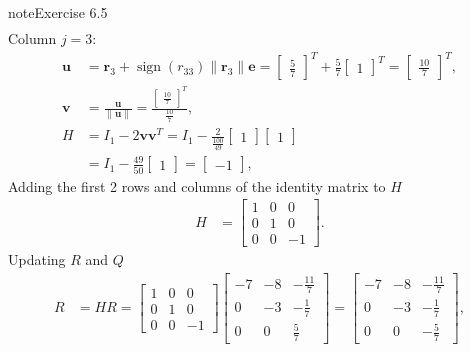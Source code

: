 \documentclass[letterpaper,10pt,english]{jupyterBook}
\begin{document}
\begin{sphinxadmonition}{note}{Exercise 6.5}
\begin{align*}
\end{align*}
\sphinxAtStartPar
Column \(j = 3\):
\begin{align*}
    \mathbf{u} &= \mathbf{r}_{3} + \operatorname{sign}(r_{33}) \| \mathbf{r}_{3} \| \mathbf{e} = \left[\begin{matrix}\frac{5}{7}\end{matrix}\right]^T + \frac{5}{7} \left[\begin{matrix}1\end{matrix}\right]^T = \left[\begin{matrix}\frac{10}{7}\end{matrix}\right]^T, \\
    \mathbf{v} &= \frac{\mathbf{u}}{\| \mathbf{u} \|} = \frac{\left[\begin{matrix}\frac{10}{7}\end{matrix}\right]^T}{\frac{10}{7}}, \\
    H &= I_1 - 2\mathbf{vv}^T = I_1 - \frac{2}{\frac{100}{49}}\left[\begin{matrix}1\end{matrix}\right]\left[\begin{matrix}1\end{matrix}\right] \\
      &= I_1 - \frac{49}{50}\left[\begin{matrix}1\end{matrix}\right] = \left[\begin{matrix}-1\end{matrix}\right],
\end{align*}
\sphinxAtStartPar
Adding the first 2 rows and columns of the identity matrix to \(H\)
\begin{align*}
    H &= \left[\begin{matrix}1 & 0 & 0\\0 & 1 & 0\\0 & 0 & -1\end{matrix}\right].
\end{align*}
\sphinxAtStartPar
Updating \(R\) and \(Q\)
\begin{align*}
    R &= H R = \left[\begin{matrix}1 & 0 & 0\\0 & 1 & 0\\0 & 0 & -1\end{matrix}\right]\left[\begin{matrix}-7 & -8 & - \frac{11}{7}\\0 & -3 & - \frac{1}{7}\\0 & 0 & \frac{5}{7}\end{matrix}\right] = \left[\begin{matrix}-7 & -8 & - \frac{11}{7}\\0 & -3 & - \frac{1}{7}\\0 & 0 & - \frac{5}{7}\end{matrix}\right], \\

\end{align*}
\end{sphinxadmonition}
\end{document}

